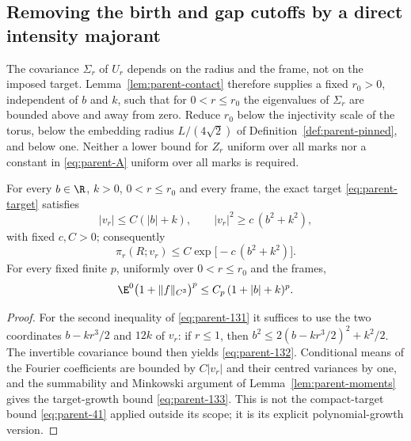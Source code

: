 \subsection{Removing the birth and gap cutoffs by a direct intensity majorant}\label{ssec:parent-majorant}

The covariance $\Sigma_r$ of $U_r$ depends on the radius and the frame, not on the imposed target. Lemma~\ref{lem:parent-contact} therefore supplies a fixed $r_0>0$, independent of $b$ and $k$, such that for $0<r\le r_0$ the eigenvalues of $\Sigma_r$ are bounded above and away from zero. Reduce $r_0$ below the injectivity scale of the torus, below the embedding radius $L/(4\sqrt2)$ of Definition~\ref{def:parent-pinned}, and below one. Neither a lower bound for $Z_r$ uniform over all marks nor a constant in \eqref{eq:parent-A} uniform over all marks is required.

\begin{lemma}\label{lem:parent-growth}
For every $b\in\R$, $k>0$, $0<r\le r_0$ and every frame, the exact target \eqref{eq:parent-target} satisfies
\begin{equation}\label{eq:parent-131}
|v_r|\le C(|b|+k),\qquad |v_r|^2\ge c\,(b^2+k^2),
\end{equation}
with fixed $c,C>0$; consequently
\begin{equation}\label{eq:parent-132}
\pi_r(R;v_r)\le C\exp\bigl[-c\,(b^2+k^2)\bigr].
\end{equation}
For every fixed finite $p$, uniformly over $0<r\le r_0$ and the frames,
\begin{equation}\label{eq:parent-133}
\E^0\bigl(1+\|f\|_{C^3}\bigr)^p\le C_p\,(1+|b|+k)^p .
\end{equation}
\end{lemma}

\begin{proof}
For the second inequality of \eqref{eq:parent-131} it suffices to use the two coordinates $b-kr^3/2$ and $12k$ of $v_r$: if $r\le1$, then $b^2\le2(b-kr^3/2)^2+k^2/2$. The invertible covariance bound then yields \eqref{eq:parent-132}. Conditional means of the Fourier coefficients are bounded by $C|v_r|$ and their centred variances by one, and the summability and Minkowski argument of Lemma~\ref{lem:parent-moments} gives the target-growth bound \eqref{eq:parent-133}. This is not the compact-target bound \eqref{eq:parent-41} applied outside its scope; it is its explicit polynomial-growth version.
\end{proof}

